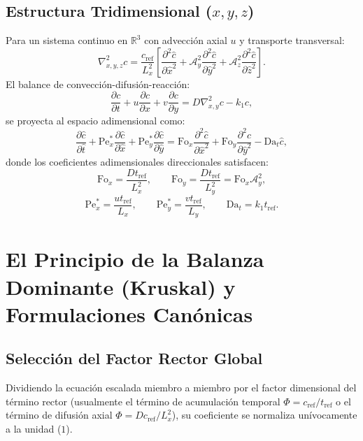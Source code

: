 \documentclass[11pt,a4paper]{article}
\begin{document}
\subsection{Estructura Tridimensional ($x, y, z$)}
Para un sistema continuo en $\mathbb{R}^3$ con advección axial $u$ y transporte transversal:
\begin{equation}
\nabla_{x,y,z}^2 c = \frac{c_{\mathrm{ref}}}{L_x^2} \left[ \frac{\partial^2 \hat{c}}{\partial \hat{x}^2} + \mathcal{A}_y^2 \frac{\partial^2 \hat{c}}{\partial \hat{y}^2} + \mathcal{A}_z^2 \frac{\partial^2 \hat{c}}{\partial \hat{z}^2} \right].
\end{equation}
El balance de convección-difusión-reacción:
\begin{equation}
\frac{\partial c}{\partial t} + u \frac{\partial c}{\partial x} + v \frac{\partial c}{\partial y} = D \nabla_{x,y}^2 c - k_1 c,
\end{equation}
se proyecta al espacio adimensional como:
\begin{equation}
\frac{\partial \hat{c}}{\partial \hat{t}} + \mathrm{Pe}_x^* \frac{\partial \hat{c}}{\partial \hat{x}} + \mathrm{Pe}_y^* \frac{\partial \hat{c}}{\partial \hat{y}} = \mathrm{Fo}_x \frac{\partial^2 \hat{c}}{\partial \hat{x}^2} + \mathrm{Fo}_y \frac{\partial^2 \hat{c}}{\partial \hat{y}^2} - \mathrm{Da}_t \hat{c},
\end{equation}
donde los coeficientes adimensionales direccionales satisfacen:
\begin{equation}
\mathrm{Fo}_x = \frac{D t_{\mathrm{ref}}}{L_x^2}, \qquad \mathrm{Fo}_y = \frac{D t_{\mathrm{ref}}}{L_y^2} = \mathrm{Fo}_x \mathcal{A}_y^2,
\end{equation}
\begin{equation}
\mathrm{Pe}_x^* = \frac{u t_{\mathrm{ref}}}{L_x}, \qquad \mathrm{Pe}_y^* = \frac{v t_{\mathrm{ref}}}{L_y}, \qquad \mathrm{Da}_t = k_1 t_{\mathrm{ref}}.
\end{equation}

\section{El Principio de la Balanza Dominante (Kruskal) y Formulaciones Canónicas}

\subsection{Selección del Factor Rector Global}
Dividiendo la ecuación escalada miembro a miembro por el factor dimensional del término rector (usualmente el término de acumulación temporal $\Phi = c_{\mathrm{ref}}/t_{\mathrm{ref}}$ o el término de difusión axial $\Phi = D c_{\mathrm{ref}}/L_x^2$), su coeficiente se normaliza unívocamente a la unidad ($1$).
\end{document}
